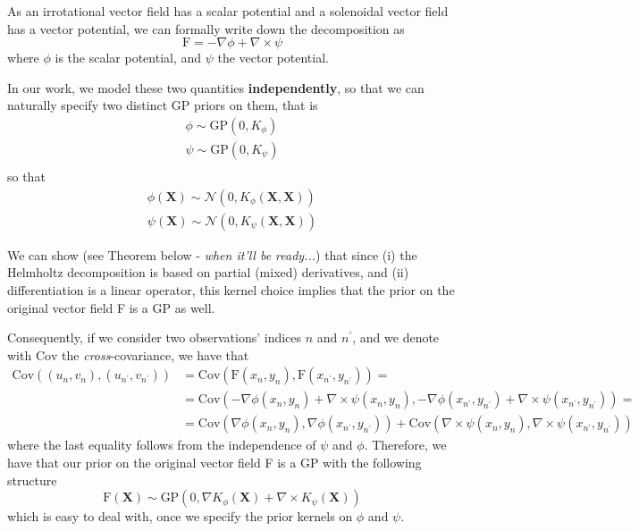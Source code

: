 \documentclass[11pt,a4paper]{article}
\begin{document}
As an irrotational vector field has a scalar potential and a solenoidal vector field has a vector potential, we can formally write down the decomposition as 
$$
 \text{F} = -\nabla \phi +\nabla \times \psi
$$
 where $\phi$ is the scalar potential, and $\psi$ the vector potential.
 
 In our work, we model these two quantities \textbf{independently}, so that we can naturally specify two distinct GP priors on them, that is
\begin{align*}
    \phi \sim \text{GP}(0, K_{\phi}) \\
    \psi \sim \text{GP}(0,K_{\psi}) \\
\end{align*}
so that 
\begin{align*}
    \phi(\textbf{X}) \sim \mathcal{N}(0, K_{\phi}(\textbf{X}, \textbf{X})) \\
\psi(\textbf{X}) \sim \mathcal{N}(0, K_{\psi}(\textbf{X}, \textbf{X}))
\end{align*}


We can show (see Theorem below  - \textit{when it'll be ready...}) that since (i) the Helmholtz decomposition is based on partial (mixed) derivatives, and (ii) differentiation is a linear operator, this kernel choice implies that the prior on the original vector field F is a GP as well. 

Consequently, if we consider two observations' indices $n$ and $n^\prime$, and we denote with $\text{Cov}$ the \textit{cross}-covariance, we have that 
\begin{align*}
    \text{Cov}((u_n, v_n), (u_{n^\prime}, v_{n^\prime})) &= \text{Cov}(\text{F}(x_n, y_n), \text{F}(x_{n^\prime}, y_{n^\prime})) = \\
    &= \text{Cov}(-\nabla \phi(x_n, y_n) + \nabla \times \psi(x_n, y_n) , -\nabla \phi(x_{n^\prime}, y_{n^\prime})+\nabla \times \psi(x_{n^\prime}, y_{n^\prime})) = \\
    &= \text{Cov}(\nabla \phi(x_n, y_n), \nabla \phi(x_{n^\prime}, y_{n^\prime})) + \text{Cov}(\nabla \times \psi(x_n, y_n), \nabla \times \psi(x_{n^\prime}, y_{n^\prime}))
\end{align*}
where the last equality follows from the independence of $\psi$ and $\phi$. Therefore, we have that our prior on the original vector field F is a GP with the following structure
$$
\text{F}(\textbf{X}) \sim \text{GP}(0, \nabla K_{\phi}(\textbf{X}) + \nabla \times K_{\psi}(\textbf{X}))
$$
which is easy to deal with, once we specify the prior kernels on $\phi$ and $\psi$.
\end{document}
